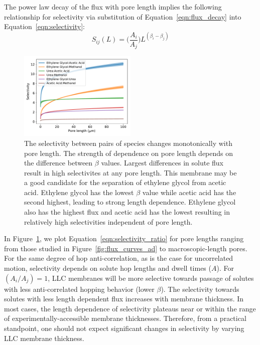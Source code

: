 \documentclass[aps,pre,preprint,groupedaddress,longbibliography]{revtex4-2}
\begin{document}
  The power law decay of the flux with pore length implies the following relationship
  for selectivity via substitution of Equation~\ref{eqn:flux_decay} into 
  Equation~\ref{eqn:selectivity}:
  \begin{equation}
  S_{ij}(L) = \bigg(\frac{A_i}{A_j}\bigg)L^{(\beta_i - \beta_j)}
  \label{eqn:selectivity_ratio}
  \end{equation}

  \begin{figure}
  \centering
  \includegraphics[width=0.5\textwidth]{selectivity.pdf}
  
  \caption{The selectivity between pairs of species changes monotonically with pore length. 
  The strength of dependence on pore length depends on the difference between $\beta$ values.
  Largest differences in solute flux result in high selectivites at any pore length.
  This membrane may be a good candidate for the separation of ethylene glycol from acetic
  acid. Ethylene glycol has the lowest $\beta$ value while acetic acid has the second highest, 
  leading to strong length dependence. Ethylene glycol also has the highest flux and acetic acid
  has the lowest resulting in relatively high selectivities independent of pore length.}
  \label{fig:selectivity}
  \end{figure}
   
  In Figure~\ref{fig:selectivity}, we plot Equation~\ref{eqn:selectivity_ratio} for pore
  lengths ranging from those studied in Figure~\ref{fig:flux_curves_ad} to macroscopic-length
  pores. For the same degree of hop anti-correlation, as is the case for uncorrelated motion, 
  selectivity depends on solute hop lengths and dwell times ($A$). For $(A_i / A_j)=1$, LLC
  membranes will be more selective towards passage of solutes with less anti-correlated hopping
  behavior (lower $\beta$). The selectivity towards solutes with less length dependent flux
  increases with membrane thickness. 
  In most cases, the length dependence of selectivity plateaus near or within the range of 
  experimentally-accessible membrane thicknesses. Therefore, from a practical standpoint, 
  one should not expect significant changes in selectivity by varying LLC membrane thickness. 
  
\end{document}
